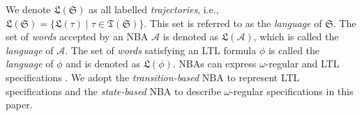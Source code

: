 \documentclass[acmlarge]{acmart}
\begin{document}
We denote $\mathfrak{L}(\mathfrak{S})$ as all labelled \emph{trajectories}, i.e., $\mathfrak{L}(\mathfrak{S})=\{\mathfrak{L}(\tau) \mid \tau \in \mathfrak{T}(\mathfrak{S})\}$. This set is referred to as the \emph{language} of \(\mathfrak{S}\). The set of \emph{words} accepted by an NBA \(\mathcal{A}\) is denoted as \(\mathfrak{L}(\mathcal{A})\), which is called the \emph{language} of $\mathcal{A}$. The set of \emph{words} satisfying an LTL formula \(\phi\) is called the \emph{language} of \(\phi\) and is denoted as \(\mathfrak{L}(\phi)\). NBAs can express $\omega$-regular and LTL specifications \cite{vardi2005automata}. We adopt the \emph{transition-based} NBA to represent LTL specifications and the \emph{state-based} NBA to describe $\omega$-regular specifications in this paper. 
\end{document}
